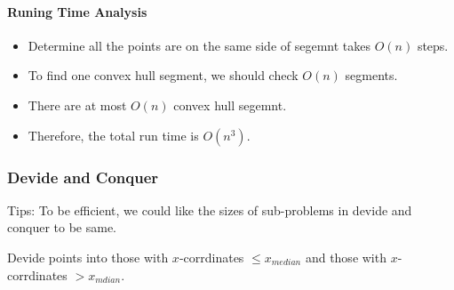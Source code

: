 \documentclass[en,hazy,blue,screen,14pt]{elegantnote}
\begin{document}
\paragraph{Runing Time Analysis}
\begin{itemize}
\item Determine all the points are on the same side of segemnt takes $O(n)$ 
steps.
\item To find one convex hull segment, we should check $O(n)$ segments.
\item There are at most $O(n)$ convex hull segemnt.
\item Therefore, the total run time is $O(n^3)$.
\end{itemize}

\subsubsection{Devide and Conquer}
Tips: To be efficient, we could like the sizes of sub-problems in devide and 
conquer to be same.

Devide points into those with $x$-corrdinates $\le x_{median}$ and those with 
$x$-corrdinates $> x_{mdian}$.
\end{document}
